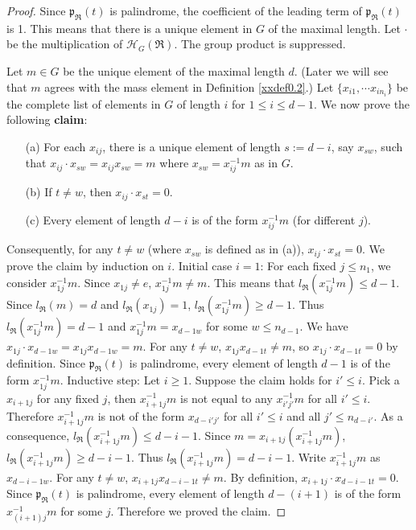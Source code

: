 \begin{proof} Since ${\mathfrak{p}}_\Re(t)$ is palindrome, the coefficient 
of the leading term of ${\mathfrak{p}}_\Re(t)$ is 1. This means that there
is a unique element in $G$ of the maximal length. Let $\cdot$ 
be the multiplication of ${\mathcal H}_G(\Re)$. The group product
is suppressed.

Let $m\in G$ be the unique element of the maximal 
length $d$. (Later we will see that $m$ agrees with the mass element
in Definition \ref{xxdef0.2}.)
Let $\{x_{i1},\cdots x_{in_i}\}$ be the complete list of 
elements in $G$ of length $i$ for $1\leq i\leq d-1$. We now prove the 
following {\bf claim}: 
\begin{enumerate}
\item[(a)]
For each $x_{ij}$, there is a unique element of length 
$s:=d-i$, say $x_{sw}$, such that $x_{ij}\cdot x_{sw}=x_{ij} x_{sw}=m$ 
where $x_{sw}=x_{ij}^{-1}m$ as in $G$. 
\item[(b)]
If $t\neq w$, then $x_{ij}\cdot x_{st}=0$.
\item[(c)]
Every element 
of length $d-i$ is of the form $x_{ij}^{-1}m$ (for different $j$). 
\end{enumerate}
Consequently, for any  $t\neq w$ (where $x_{sw}$ is defined as in (a)), 
$x_{ij}\cdot x_{st}=0$. 
We prove the claim by induction on $i$. Initial case $i=1$:
For each fixed $j\leq n_1$, we consider $x_{1j}^{-1} m$. Since $x_{1j}\neq e$,
$x_{1j}^{-1}m\neq m$. This means that ${l_{\Re}}(x_{1j}^{-1}m)\leq d-1$.
Since ${l_{\Re}}(m)=d$ and ${l_{\Re}}(x_{1j})=1$, ${l_{\Re}}(x_{1j}^{-1}m)\geq d-1$. Thus
${l_{\Re}}(x_{1j}^{-1}m)= d-1$ and $x_{1j}^{-1}m=x_{d-1w}$ for some 
$w\leq n_{d-1}$. We have $x_{1j}\cdot x_{d-1w}=x_{1j}x_{d-1w}=m$.
For any $t\neq w$, $x_{1j}x_{d-1t}\neq m$, so 
$x_{1j}\cdot x_{d-1 t}=0$ by definition. Since ${\mathfrak{p}}_\Re(t)$ is 
palindrome, every element of length $d-1$ is of the form $x_{1j}^{-1}m$. 
Inductive step: Let $i\geq 1$. Suppose the claim holds for $i'\leq i$.
Pick a $x_{i+1j}$ for any fixed $j$, then $x_{i+1j}^{-1}m$ is not equal to any 
$x_{i'j'}^{-1}m$ for all $i'\leq i$. Therefore $x_{i+1j}^{-1}m$ is not
of the form $x_{d-i'j'}$ for all $i'\leq i$ and all $j'\leq n_{d-i'}$.
As a consequence, ${l_{\Re}}(x_{i+1j}^{-1}m)\leq d-i-1$. Since 
$m=x_{i+1j}(x_{i+1j}^{-1}m)$, ${l_{\Re}}(x_{i+1j}^{-1}m)\geq d-i-1$. 
Thus ${l_{\Re}}(x_{i+1j}^{-1}m)=d-i-1$. Write $x_{i+1j}^{-1}m$ as $x_{d-i-1w}$.
For any $t\neq w$, $x_{i+1j} x_{d-i-1t}\neq m$. By definition,
$x_{i+1j}\cdot x_{d-i-1t}=0$. Since ${\mathfrak{p}}_\Re(t)$ is palindrome, every element 
of length $d-(i+1)$ is of the form $x_{(i+1)j}^{-1}m$ for some $j$. 
Therefore we proved the claim. 


\end{proof}

